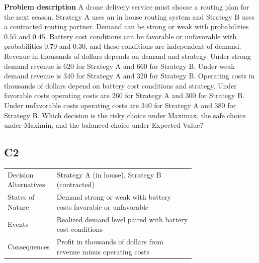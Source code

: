 \begin{ExamProblems}
			\item
			\textbf{Problem description}
			A drone delivery service must choose a routing plan for the next season. Strategy A uses an in house routing system and Strategy B uses a contracted routing partner. Demand can be strong or weak with probabilities $0.55$ and $0.45$. Battery cost conditions can be favorable or unfavorable with probabilities $0.70$ and $0.30$, and these conditions are independent of demand. Revenue in thousands of dollars depends on demand and strategy. Under strong demand revenue is 620 for Strategy A and 660 for Strategy B. Under weak demand revenue is 340 for Strategy A and 320 for Strategy B. Operating costs in thousands of dollars depend on battery cost conditions and strategy. Under favorable costs operating costs are 260 for Strategy A and 300 for Strategy B. Under unfavorable costs operating costs are 340 for Strategy A and 380 for Strategy B. Which decision is the risky choice under Maximax, the safe choice under Maximin, and the balanced choice under Expected Value?

		\subsection*{C2}
		\begin{center}
			\begin{tabular}{l p{0.74\linewidth}}
				\toprule
				Decision Alternatives & Strategy A (in house), Strategy B (contracted) \\
				States of Nature & Demand strong or weak with battery costs favorable or unfavorable \\
				Events & Realized demand level paired with battery cost conditions \\
				Consequences & Profit in thousands of dollars from revenue minus operating costs \\
				\bottomrule
			\end{tabular}
		\end{center}


\end{ExamProblems}
